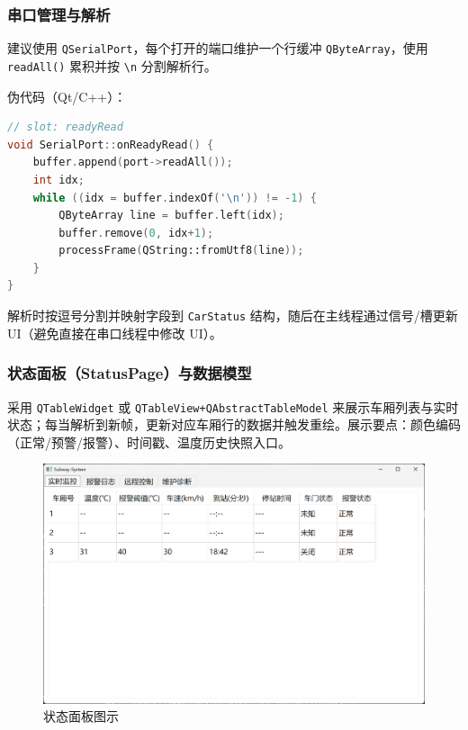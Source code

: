 \documentclass[12pt]{article}
\begin{document}
\subsubsection{串口管理与解析}
建议使用 \texttt{QSerialPort}，每个打开的端口维护一个行缓冲 \texttt{QByteArray}，使用 \texttt{readAll()} 累积并按 \texttt{\textbackslash n} 分割解析行。

伪代码（Qt/C++）：
\begin{lstlisting}[language=C++]
// slot: readyRead
void SerialPort::onReadyRead() {
	buffer.append(port->readAll());
	int idx;
	while ((idx = buffer.indexOf('\n')) != -1) {
		QByteArray line = buffer.left(idx);
		buffer.remove(0, idx+1);
		processFrame(QString::fromUtf8(line));
	}
}
\end{lstlisting}

解析时按逗号分割并映射字段到 \texttt{CarStatus} 结构，随后在主线程通过信号/槽更新 UI（避免直接在串口线程中修改 UI）。

\subsubsection{状态面板（StatusPage）与数据模型}
采用 \texttt{QTableWidget} 或 \texttt{QTableView+QAbstractTableModel} 来展示车厢列表与实时状态；每当解析到新帧，更新对应车厢行的数据并触发重绘。展示要点：颜色编码（正常/预警/报警）、时间戳、温度历史快照入口。
\begin{figure}[H]
  \centering
  \includegraphics[width=\linewidth]{images/21-05-51.png}
  \caption{状态面板图示}
  \label{fig:status_panel}
\end{figure}
\end{document}
